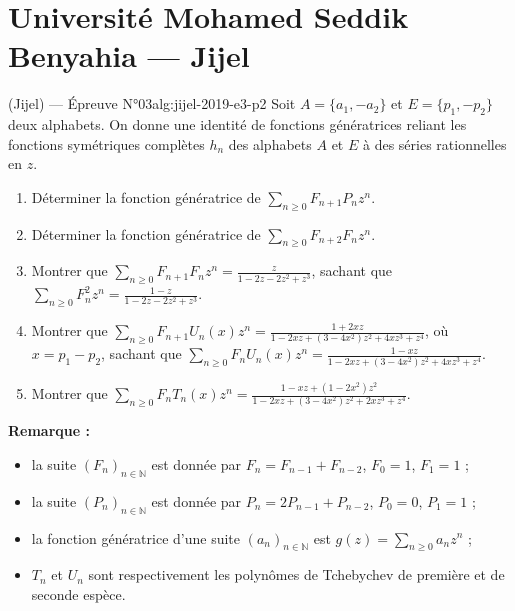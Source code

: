 \newpage

\section{Université Mohamed Seddik Benyahia --- Jijel}

\begin{problem}{(Jijel) — Épreuve N°03}{alg:jijel-2019-e3-p2}
Soit $A = \{a_1, -a_2\}$ et $E = \{p_1, -p_2\}$ deux alphabets. On donne une
identité de fonctions génératrices reliant les fonctions symétriques complètes
$h_n$ des alphabets $A$ et $E$ à des séries rationnelles en $z$.
\begin{enumerate}
\item Déterminer la fonction génératrice de $\displaystyle\sum_{n \ge 0} F_{n+1} P_n z^n$.
\item Déterminer la fonction génératrice de $\displaystyle\sum_{n \ge 0} F_{n+2} F_n z^n$.
\item Montrer que
      $\displaystyle\sum_{n \ge 0} F_{n+1} F_n z^n = \frac{z}{1 - 2z - 2z^2 + z^3}$,
      sachant que
      $\displaystyle\sum_{n \ge 0} F_n^2 z^n = \frac{1 - z}{1 - 2z - 2z^2 + z^3}$.
\item Montrer que
      $\displaystyle\sum_{n \ge 0} F_{n+1} U_n(x) z^n = \frac{1 + 2xz}{1 - 2xz + (3 - 4x^2)z^2 + 4xz^3 + z^4}$,
      où $x = p_1 - p_2$, sachant que
      $\displaystyle\sum_{n \ge 0} F_n U_n(x) z^n = \frac{1 - xz}{1 - 2xz + (3 - 4x^2)z^2 + 4xz^3 + z^4}$.
\item Montrer que
      $\displaystyle\sum_{n \ge 0} F_n T_n(x) z^n = \frac{1 - xz + (1 - 2x^2)z^2}{1 - 2xz + (3 - 4x^2)z^2 + 2xz^3 + z^4}$.
\end{enumerate}
\textbf{Remarque :}
\begin{itemize}
\item la suite $(F_n)_{n \in \mathbb{N}}$ est donnée par $F_n = F_{n-1} + F_{n-2}$,
      $F_0 = 1$, $F_1 = 1$ ;
\item la suite $(P_n)_{n \in \mathbb{N}}$ est donnée par $P_n = 2P_{n-1} + P_{n-2}$,
      $P_0 = 0$, $P_1 = 1$ ;
\item la fonction génératrice d'une suite $(a_n)_{n \in \mathbb{N}}$ est
      $g(z) = \sum_{n \ge 0} a_n z^n$ ;
\item $T_n$ et $U_n$ sont respectivement les polynômes de Tchebychev de première et
      de seconde espèce.
\end{itemize}

\end{problem}


